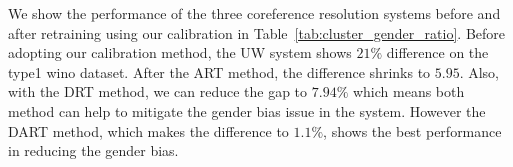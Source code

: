 We show the performance of the three coreference resolution systems before and after retraining using our calibration in Table~\ref{tab:cluster_gender_ratio}.
Before adopting our calibration method, the UW system shows $21\%$ difference on the type1 wino dataset.
After the ART method, the difference shrinks to $5.95$. Also, with the DRT method, we can  reduce the gap to $7.94\%$ which means both method can help to mitigate the gender bias issue in the system. However the DART method, which makes the difference to $1.1\%$, shows the best performance in reducing the gender bias.

 

 



